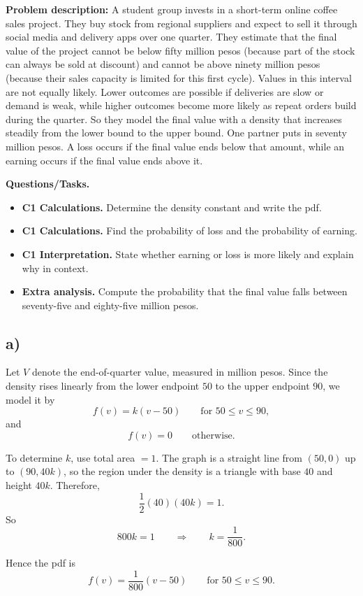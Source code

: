 \textbf{Problem description:}
A student group invests in a short-term online coffee sales project. They buy stock from regional suppliers and expect to sell it through social media and delivery apps over one quarter. They estimate that the final value of the project cannot be below fifty million pesos (because part of the stock can always be sold at discount) and cannot be above ninety million pesos (because their sales capacity is limited for this first cycle). Values in this interval are not equally likely. Lower outcomes are possible if deliveries are slow or demand is weak, while higher outcomes become more likely as repeat orders build during the quarter. So they model the final value with a density that increases steadily from the lower bound to the upper bound. One partner puts in seventy million pesos. A loss occurs if the final value ends below that amount, while an earning occurs if the final value ends above it.

\textbf{Questions/Tasks.}
\begin{itemize}
	\item \textbf{C1 Calculations.} Determine the density constant and write the pdf.
	\item \textbf{C1 Calculations.} Find the probability of loss and the probability of earning.
	\item \textbf{C1 Interpretation.} State whether earning or loss is more likely and explain why in context.
\item \textbf{Extra analysis.} Compute the probability that the final value falls between seventy-five and eighty-five million pesos.
\end{itemize}

\subsection*{a)}
Let $V$ denote the end-of-quarter value, measured in million pesos. Since the density rises linearly from the lower endpoint $50$ to the upper endpoint $90$, we model it by
\[
f(v)=k(v-50)\qquad \text{for }50\le v\le 90,
\]
and
\[
f(v)=0\qquad \text{otherwise.}
\]

To determine $k$, use total area $=1$. The graph is a straight line from $(50,0)$ up to $(90,40k)$, so the region under the density is a triangle with base $40$ and height $40k$. Therefore,
\[
\frac12(40)(40k)=1.
\]
So
\[
800k=1
\qquad \Rightarrow \qquad
k=\frac{1}{800}.
\]

Hence the pdf is
\[
f(v)=\frac{1}{800}(v-50)\qquad \text{for }50\le v\le 90.
\]

